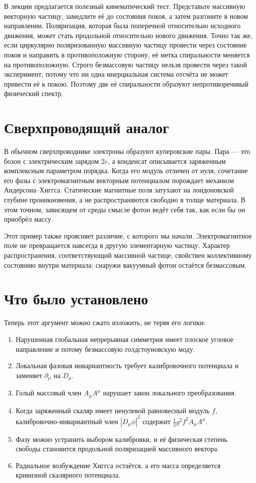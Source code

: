 В лекции предлагается полезный кинематический тест. Представьте массивную векторную частицу, замедлите её до состояния покоя, а затем разгоните в новом направлении. Поляризация, которая была поперечной относительно исходного движения, может стать продольной относительно нового движения. Точно так же, если циркулярно поляризованную массивную частицу провести через состояние покоя и направить в противоположную сторону, её метка спиральности меняется на противоположную. Строго безмассовую частицу нельзя провести через такой эксперимент, потому что ни одна инерциальная система отсчёта не может привести её к покою. Поэтому две её спиральности образуют непротиворечивый физический спектр.

\section{Сверхпроводящий аналог}

В обычном сверхпроводнике электроны образуют куперовские пары. Пара — это бозон с электрическим зарядом \(2e\), а конденсат описывается заряженным комплексным параметром порядка. Когда его модуль отличен от нуля, сочетание его фазы с электромагнитным векторным потенциалом порождает механизм Андерсона--Хиггса. Статические магнитные поля затухают на лондоновской глубине проникновения, а не распространяются свободно в толще материала. В этом точном, зависящем от среды смысле фотон ведёт себя так, как если бы он приобрёл массу.

Этот пример также проясняет различие, с которого мы начали. Электромагнитное поле не превращается навсегда в другую элементарную частицу. Характер распространения, соответствующий массивной частице, свойствен коллективному состоянию внутри материала; снаружи вакуумный фотон остаётся безмассовым.

\section{Что было установлено}

Теперь этот аргумент можно сжато изложить, не теряя его логики:
\begin{enumerate}
  \item Нарушенная глобальная непрерывная симметрия имеет плоское угловое направление и потому безмассовую голдстоуновскую моду.
  \item Локальная фазовая инвариантность требует калибровочного потенциала и заменяет \(\partial_\mu\) на \(D_\mu\).
  \item Голый массовый член \(A_\mu A^\mu\) нарушает закон локального преобразования.
  \item Когда заряженный скаляр имеет ненулевой равновесный модуль \(f\), калибровочно-инвариантный член \(|D_\mu\phi|^2\) содержит \(\frac12g^2f^2A_\mu A^\mu\).
  \item Фазу можно устранить выбором калибровки, и её физическая степень свободы становится продольной поляризацией массивного вектора.
  \item Радиальное возбуждение Хиггса остаётся, а его масса определяется кривизной скалярного потенциала.
\end{enumerate}

